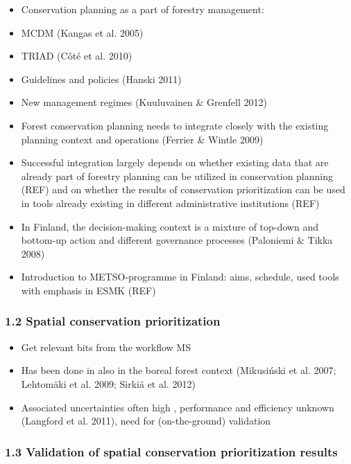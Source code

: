 \documentclass[]{article}
\begin{document}
\begin{itemize}
\itemsep1pt\parskip0pt
\item
  Conservation planning as a part of forestry management:
\item
  MCDM (Kangas et al. 2005)
\item
  TRIAD (Côté et al. 2010)
\item
  Guidelines and policies (Hanski 2011)
\item
  New management regimes (Kuuluvainen \& Grenfell 2012)
\item
  Forest conservation planning needs to integrate closely with the
  existing planning context and operations (Ferrier \& Wintle 2009)
\item
  Successful integration largely depends on whether existing data that
  are already part of forestry planning can be utilized in conservation
  planning (REF) and on whether the results of conservation
  prioritization can be used in tools already existing in different
  administrative institutions (REF)
\item
  In Finland, the decision-making context is a mixture of top-down and
  bottom-up action and different governance processes (Paloniemi \&
  Tikka 2008)
\item
  Introduction to METSO-programme in Finland: aims, schedule, used tools
  with emphasis in ESMK (REF)
\end{itemize}

\subsubsection{1.2 Spatial conservation prioritization}

\begin{itemize}
\itemsep1pt\parskip0pt
\item
  Get relevant bits from the workflow MS
\item
  Has been done in also in the boreal forest context (Mikusiński et al.
  2007; Lehtomäki et al. 2009; Sirkiä et al. 2012)⁠
\item
  Associated uncertainties often high , performance and efficiency
  unknown (Langford et al. 2011), need for (on-the-ground) validation
\end{itemize}

\subsubsection{1.3 Validation of spatial conservation prioritization
results}
\end{document}
